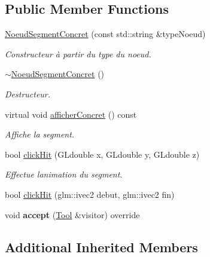 \subsection*{Public Member Functions}
{\bf }\par
\begin{DoxyCompactItemize}
\item 
\hyperlink{class_noeud_segment_concret_a5fa9b4c7e916ecba1afdee2b92b782d0}{Noeud\+Segment\+Concret} (const std\+::string \&type\+Noeud)
\begin{DoxyCompactList}\small\item\em Constructeur à partir du type du noeud. \end{DoxyCompactList}\item 
\hyperlink{class_noeud_segment_concret_a1b6277e30f5a24954bd38c915914887d}{$\sim$\+Noeud\+Segment\+Concret} ()
\begin{DoxyCompactList}\small\item\em Destructeur. \end{DoxyCompactList}\item 
virtual void \hyperlink{class_noeud_segment_concret_a755c965f09fe2ca3d148812fda08b5d6}{afficher\+Concret} () const 
\begin{DoxyCompactList}\small\item\em Affiche la segment. \end{DoxyCompactList}\item 
bool \hyperlink{class_noeud_segment_concret_a5aa1e10fe850cab0bb32290f9f228e9b}{click\+Hit} (G\+Ldouble x, G\+Ldouble y, G\+Ldouble z)
\begin{DoxyCompactList}\small\item\em Effectue l\textquotesingle{}animation du segment. \end{DoxyCompactList}\item 
bool \hyperlink{class_noeud_segment_concret_a6a98a44348fcd5fcccad77ffa48efc52}{click\+Hit} (glm\+::ivec2 debut, glm\+::ivec2 fin)
\item 
\hypertarget{class_noeud_segment_concret_a89f6362356646f3cc7d564aba168712d}{}void {\bfseries accept} (\hyperlink{class_tool}{Tool} \&visitor) override\label{class_noeud_segment_concret_a89f6362356646f3cc7d564aba168712d}

\end{DoxyCompactItemize}

\subsection*{Additional Inherited Members}


